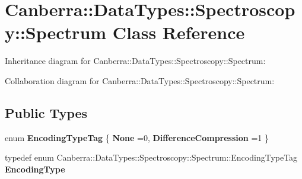 \hypertarget{class_canberra_1_1_data_types_1_1_spectroscopy_1_1_spectrum}{}\section{Canberra\+:\+:Data\+Types\+:\+:Spectroscopy\+:\+:Spectrum Class Reference}
\label{class_canberra_1_1_data_types_1_1_spectroscopy_1_1_spectrum}


Inheritance diagram for Canberra\+:\+:Data\+Types\+:\+:Spectroscopy\+:\+:Spectrum\+:


Collaboration diagram for Canberra\+:\+:Data\+Types\+:\+:Spectroscopy\+:\+:Spectrum\+:
\subsection*{Public Types}
\begin{DoxyCompactItemize}
\item 
\mbox{\label{class_canberra_1_1_data_types_1_1_spectroscopy_1_1_spectrum_a9a041c9888937993faf74949685b9de6}} 
enum {\bfseries Encoding\+Type\+Tag} \{ {\bfseries None} =0, 
{\bfseries Difference\+Compression} =1
 \}
\item 
\mbox{\label{class_canberra_1_1_data_types_1_1_spectroscopy_1_1_spectrum_ade737143129c83eceefa8577c181ce93}} 
typedef enum Canberra\+::\+Data\+Types\+::\+Spectroscopy\+::\+Spectrum\+::\+Encoding\+Type\+Tag {\bfseries Encoding\+Type}
\end{DoxyCompactItemize}
